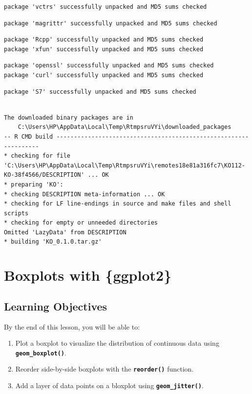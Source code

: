 \documentclass[
  letterpaper,
  DIV=11,
  numbers=noendperiod]{scrreprt}
\providecommand{\tightlist}{%
  \setlength{\itemsep}{0pt}\setlength{\parskip}{0pt}}\usepackage{longtable,booktabs,array}
\begin{document}
\begin{verbatim}
package 'vctrs' successfully unpacked and MD5 sums checked
\end{verbatim}

\begin{verbatim}
package 'magrittr' successfully unpacked and MD5 sums checked
\end{verbatim}

\begin{verbatim}
package 'Rcpp' successfully unpacked and MD5 sums checked
package 'xfun' successfully unpacked and MD5 sums checked
\end{verbatim}

\begin{verbatim}
package 'openssl' successfully unpacked and MD5 sums checked
package 'curl' successfully unpacked and MD5 sums checked
\end{verbatim}

\begin{verbatim}
package 'S7' successfully unpacked and MD5 sums checked
\end{verbatim}

\begin{verbatim}

The downloaded binary packages are in
    C:\Users\HP\AppData\Local\Temp\RtmpsruVYi\downloaded_packages
-- R CMD build -----------------------------------------------------------------
* checking for file 'C:\Users\HP\AppData\Local\Temp\RtmpsruVYi\remotes18e81a316fc7\KO112-KO-38f4566/DESCRIPTION' ... OK
* preparing 'KO':
* checking DESCRIPTION meta-information ... OK
* checking for LF line-endings in source and make files and shell scripts
* checking for empty or unneeded directories
Omitted 'LazyData' from DESCRIPTION
* building 'KO_0.1.0.tar.gz'
\end{verbatim}

\section{Boxplots with \{ggplot2\}}\label{boxplots-with-ggplot2-1}

\subsection{Learning Objectives}\label{learning-objectives-18}

By the end of this lesson, you will be able to:

\begin{enumerate}
\def\labelenumi{\arabic{enumi}.}
\tightlist
\item
  Plot a boxplot to visualize the distribution of continuous data using
  \textbf{\texttt{geom\_boxplot()}}.
\item
  Reorder side-by-side boxplots with the \textbf{\texttt{reorder()}}
  function.
\item
  Add a layer of data points on a bloxplot using
  \textbf{\texttt{geom\_jitter()}}.
\end{enumerate}
\end{document}
